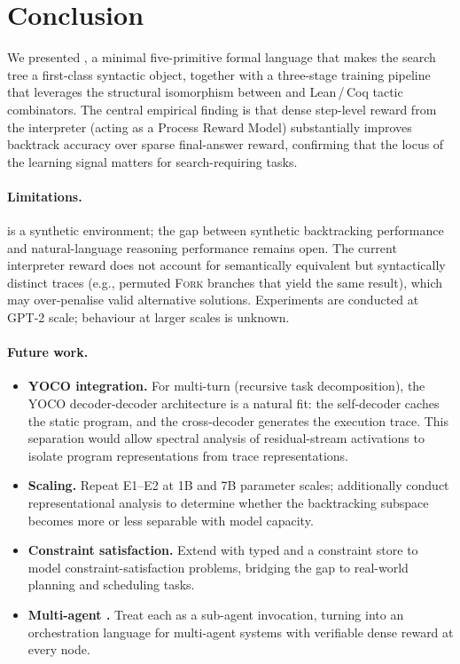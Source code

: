\section{Conclusion}
\label{sec:conclusion}

We presented \gore{}, a minimal five-primitive formal language that makes the
search tree a first-class syntactic object, together with a three-stage training
pipeline that leverages the structural isomorphism between \gore{} and
Lean\,/\,Coq tactic combinators.
The central empirical finding is that dense step-level reward from the \gore{}
interpreter (acting as a Process Reward Model) substantially improves backtrack
accuracy over sparse final-answer reward, confirming that the locus of the
learning signal matters for search-requiring tasks.


\paragraph{Limitations.}
\gore{} is a synthetic environment; the gap between synthetic backtracking
performance and natural-language reasoning performance remains open.
The current interpreter reward does not account for semantically equivalent but
syntactically distinct traces (e.g., permuted \textsc{Fork} branches that yield
the same result), which may over-penalise valid alternative solutions.
Experiments are conducted at GPT-2 scale; behaviour at larger scales is unknown.

\paragraph{Future work.}
\begin{itemize}
  \item \textbf{YOCO integration.} For multi-turn \gore{} (recursive task
    decomposition), the YOCO decoder-decoder architecture \citep{sun2024yoco}
    is a natural fit: the self-decoder caches the static \gore{} program, and
    the cross-decoder generates the execution trace.
    This separation would allow spectral analysis of residual-stream activations
    to isolate program representations from trace representations.
  \item \textbf{Scaling.} Repeat E1--E2 at 1B and 7B parameter scales; additionally conduct
    representational analysis to determine whether the backtracking subspace
    becomes more or less separable with model capacity.
  \item \textbf{Constraint satisfaction.} Extend \gore{} with typed \callstmt{}
    and a constraint store to model constraint-satisfaction problems, bridging
    the gap to real-world planning and scheduling tasks.
  \item \textbf{Multi-agent \gore{}.} Treat each \callstmt{} as a sub-agent
    invocation, turning \gore{} into an orchestration language for multi-agent
    systems with verifiable dense reward at every node.
\end{itemize}

